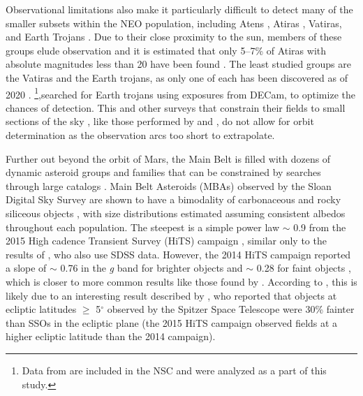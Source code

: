 \documentclass[twocolumn]{aastex62}
\begin{document}
Observational limitations also make it particularly difficult to detect many of the smaller subsets within the NEO population, including Atens , Atiras , Vatiras, and Earth Trojans .  Due to their close proximity to the sun, members of these groups elude observation and it is estimated that only 5--7\% of Atiras with absolute magnitudes less than 20  have been found \citep{ye20}.  The least studied groups are the Vatiras and the Earth trojans, as only one of each has been discovered as of 2020 \citep{Greenstreet20,Connors11}.  \cite{Markwardt}\footnote{Data from \cite{Markwardt} are included in the NSC and were analyzed as a part of this study.},searched for Earth trojans using exposures from DECam, to optimize the chances of detection.  This and other surveys that constrain their fields to small sections of the sky , like those performed by \cite{Terai13} and \cite{ivezic01},  do not allow for orbit determination as the observation arcs  too short to extrapolate. 

Further out beyond the orbit of Mars, the Main Belt is filled with dozens of dynamic asteroid groups and families that can be constrained by searches through large catalogs \citep{lemaitre}.  Main Belt Asteroids (MBAs) observed by the Sloan Digital Sky Survey are shown to have a bimodality of carbonaceous and rocky siliceous objects \citep{ivezic01}, with size distributions estimated assuming consistent albedos throughout each population.    The steepest  is a simple power law $\sim$ 0.9 from the 2015 High cadence Transient Survey (HiTS) campaign \citep{pena}, similar only to the results of \cite{parker}, who also use SDSS data.  However, the 2014 HiTS campaign reported a slope of $\sim$ 0.76 in the \textit{g} band for brighter objects and $\sim$ 0.28 for faint objects \citep{pena}, which is closer to more common results like those found by \cite{gladman09}.  According to \cite{pena}, this is likely due to an interesting result described by \cite{bhattacharya}, who reported that objects at ecliptic latitudes  $\geq$ 5$^{\circ}$ observed by the Spitzer Space Telescope were 30\% fainter than SSOs in the ecliptic plane (the 2015 HiTS campaign observed fields at a higher ecliptic latitude than the 2014 campaign).  
\end{document}
